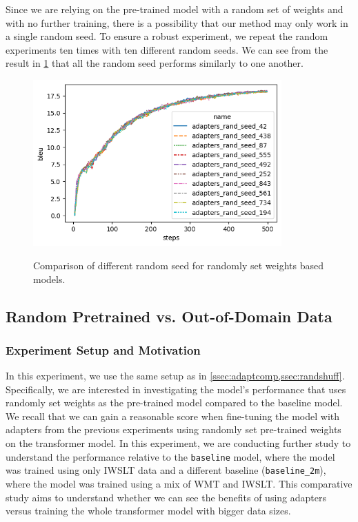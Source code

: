 Since we are relying on the pre-trained model with a random set of weights and with no further training, there is a possibility that our method may only work in a single random seed. To ensure a robust experiment, we repeat the random experiments ten times with ten different random seeds. We can see from the result in \cref{img:rndmseed} that all the random seed performs similarly to one another.

\begin{figure}[h]
    {\includegraphics[width=0.85\textwidth]{img/adapter_random_multiseed.png}}
    \centering
    \caption{Comparison of different random seed for randomly set weights based models.}
    \label{img:rndmseed}
\end{figure}

\subsection{Random Pretrained vs. Out-of-Domain Data}
\label{ssec:randpre}
\subsubsection{Experiment Setup and Motivation}
In this experiment, we use the same setup as in \cref{ssec:adaptcomp,ssec:randshuff}. Specifically, we are interested in investigating the model's performance that uses randomly set weights as the pre-trained model compared to the baseline model. We recall that we can gain a reasonable score when fine-tuning the model with adapters from the previous experiments using randomly set pre-trained weights on the transformer model. In this experiment, we are conducting further study to understand the performance relative to the \texttt{baseline} model, where the model was trained using only IWSLT data and a different baseline (\texttt{baseline\_2m}), where the model was trained using a mix of WMT and IWSLT.
\newpage
This comparative study aims to understand whether we can see the benefits of using adapters versus training the whole transformer model with bigger data sizes.

